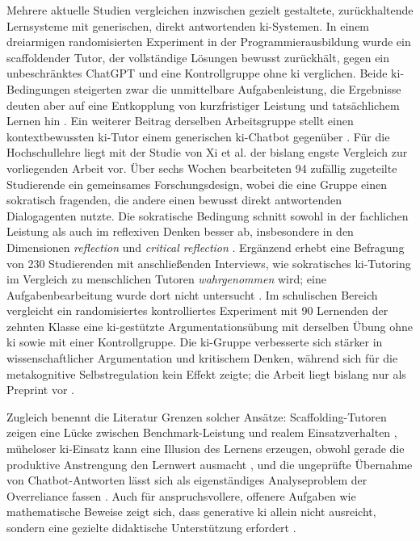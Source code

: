 Mehrere aktuelle Studien vergleichen inzwischen gezielt gestaltete, zurückhaltende Lernsysteme mit
generischen, direkt antwortenden \acrshort{ki}-Systemen. In einem dreiarmigen randomisierten
Experiment in der Programmierausbildung wurde ein scaffoldender Tutor, der vollständige Lösungen
bewusst zurückhält, gegen ein unbeschränktes ChatGPT und eine Kontrollgruppe ohne \acrshort{ki}
verglichen. Beide \acrshort{ki}-Bedingungen steigerten zwar die unmittelbare Aufgabenleistung, die
Ergebnisse deuten aber auf eine Entkopplung von kurzfristiger Leistung und tatsächlichem Lernen hin
\cite{bassnerLessStressBetter2026}. Ein weiterer Beitrag derselben Arbeitsgruppe stellt einen
kontextbewussten \acrshort{ki}-Tutor einem generischen \acrshort{ki}-Chatbot gegenüber
\cite{bassnerTowardsUnderstandingImpact2025}. Für die Hochschullehre liegt mit der Studie von Xi et
al. der bislang engste Vergleich zur vorliegenden Arbeit vor. Über sechs Wochen bearbeiteten 94
zufällig zugeteilte Studierende ein gemeinsames Forschungsdesign, wobei die eine Gruppe einen
sokratisch fragenden, die andere einen bewusst direkt antwortenden Dialogagenten nutzte. Die
sokratische Bedingung schnitt sowohl in der fachlichen Leistung als auch im reflexiven Denken
besser ab, insbesondere in den Dimensionen \emph{reflection} und \emph{critical reflection}
\cite{xiInvestigatingEffectsLLMbased2026}. Ergänzend erhebt eine Befragung von 230 Studierenden
mit anschließenden Interviews, wie sokratisches \acrshort{ki}-Tutoring im Vergleich zu menschlichen
Tutoren \emph{wahrgenommen} wird; eine Aufgabenbearbeitung wurde dort nicht untersucht
\cite{fakourSocraticWisdomAge2025}. Im schulischen Bereich vergleicht ein randomisiertes
kontrolliertes Experiment mit 90 Lernenden der zehnten Klasse eine \acrshort{ki}-gestützte
Argumentationsübung mit derselben Übung ohne \acrshort{ki} sowie mit einer Kontrollgruppe. Die
\acrshort{ki}-Gruppe verbesserte sich stärker in wissenschaftlicher Argumentation und kritischem
Denken, während sich für die metakognitive Selbstregulation kein Effekt zeigte; die Arbeit liegt
bislang nur als Preprint vor \cite{kaoSocraticAIK122025}.

Zugleich benennt die Literatur Grenzen solcher Ansätze: Scaffolding-Tutoren zeigen eine Lücke zwischen
Benchmark-Leistung und realem Einsatzverhalten \cite{neaguRethinkingScaffoldingLLM2026}, müheloser
\acrshort{ki}-Einsatz kann eine \glqq Illusion des Lernens\grqq{} erzeugen, obwohl gerade die produktive
Anstrengung den Lernwert ausmacht \cite{brcicEffortlessTrapProductive2026}, und die ungeprüfte Übernahme
von Chatbot-Antworten lässt sich als eigenständiges Analyseproblem der Overreliance fassen
\cite{jinRelianceScopeAnalyticalFramework2026}. Auch für anspruchsvollere, offenere Aufgaben wie
mathematische Beweise zeigt sich, dass generative \acrshort{ki} allein nicht ausreicht, sondern eine
gezielte didaktische Unterstützung erfordert \cite{chenGenerativeAIAlone2025}.


